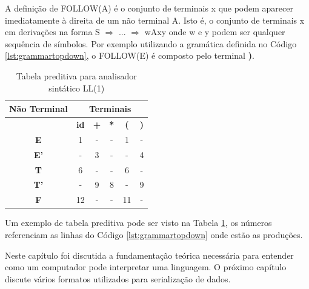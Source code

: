 A definição de FOLLOW(A) é o conjunto de terminais x que podem aparecer imediatamente
à direita de um não terminal A. Isto é, o conjunto de terminais x em derivações na forma 
S $\Rightarrow$ ... $\Rightarrow$ wAxy onde w e y podem ser qualquer sequência de símbolos.
Por exemplo utilizando a gramática definida no Código \ref{lst:grammartopdown}, o FOLLOW(E) é composto pelo terminal \textbf{)}.

\begin{table}[h]
    \centering
	\caption{Tabela preditiva para analisador sintático LL(1)}
	\label{tbl:predictive}

    \begin{tabular}{cccccc}
        \toprule
        \multicolumn{1}{c}{\textbf{Não Terminal}} & \multicolumn{5}{c}{\textbf{Terminais}} \\
        \midrule
                       & \textbf{id} & \textbf{+} & \textbf{*} & \textbf{(} & \textbf{)}   \\
        \midrule
        \textbf{E}     &     1      &      -      &      -       &     1    &    -    \\
        \textbf{E'}    &     -      &      3      &      -       &     -    &    4    \\
        \textbf{T}     &     6      &      -      &      -       &     6    &    -    \\
        \textbf{T'}    &     -      & 9           &      8       &     -    &    9    \\
        \textbf{F}     &     12     &      -      &      -       &     11   &    -    \\
        \bottomrule
    \end{tabular}
\end{table}

Um exemplo de tabela preditiva pode ser visto na Tabela \ref{tbl:predictive}, os números referenciam as linhas 
do Código \ref{lst:grammartopdown} onde estão as produções.

Neste capítulo foi discutida a fundamentação teórica necessária para entender como um computador pode
interpretar uma linguagem. O próximo capítulo discute vários formatos utilizados para serialização de dados.